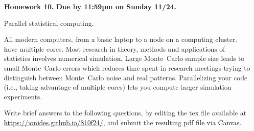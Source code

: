 \documentclass[12pt]{article}
\begin{document}
\begin{center}\bf
Homework 10. Due by 11:59pm on Sunday 11/24.

Parallel statistical computing.

\end{center}

All modern computers, from a basic laptop to a node on a computing cluster, have multiple cores.  Most research in theory, methods and applications of statistics involves numerical simulation. Large Monte~Carlo sample size leads to small Monte~Carlo errors which reduces time spent in research meetings trying to distinguish between Monte~Carlo noise and real patterns. Parallelizing your code (i.e., taking advantage of multiple cores) lets you compute larger simulation experiments.

Write brief answers to the following questions, by editing the tex file available at \url{https://ionides.github.io/810f24/}, and submit the resulting pdf file via Canvas. 
\end{document}
